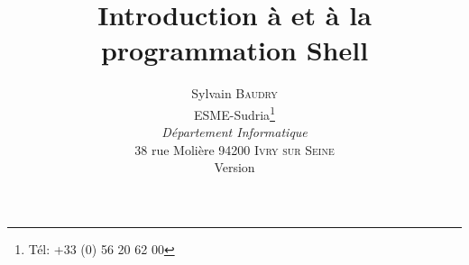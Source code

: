 \documentclass[titlepage,twoside,a4paper]{book}
\title{
	Introduction {\`a} {\Unix} et {\`a} la programmation Shell
}
\author{
	Sylvain \textsc{Baudry}\\[3ex]
	ESME-Sudria\thanks{T{\'e}l: +33 (0)  56 20 62 00}\\
	\textsl{D{\'e}partement Informatique}\\
	38 rue Moli{\`e}re
	94200 \textsc{Ivry sur Seine}\\[3ex]
	Version \docversion
}
\date{\docdate}
\newcounter{remarque-cnt}
\newcounter{example-cnt}
\begin{document}
\newenvironment{example}{
	\begin{sloppypar}
	\noindent
	\textbf{Exemple~{\thechapter}.\arabic{example-cnt}~:}\\
	\hspace*{\fill} \linebreak \vspace{-7ex}
	\begin{quote}
}
{	\end{quote}
	\stepcounter{example-cnt}
	\end{sloppypar}
}

\newenvironment{remarque}{
	\begin{sloppypar}
	\noindent
	\textbf{Remarque~{\thechapter}.\arabic{remarque-cnt}~:}\\
	\hspace*{\fill} \linebreak \vspace{-7ex}
	\begin{quote}\it
}
{
	\end{quote}
	\stepcounter{remarque-cnt}
	\end{sloppypar}
}

\newenvironment{definition}[1]{
	\begin{sloppypar}
	\noindent
	\textbf{#1~:}\\
	\hspace*{\fill} \linebreak \vspace{-7ex}
	\begin{quote}
}
{	\end{quote}
	\end{sloppypar}
}


\maketitle						%

\frontmatter

\lhead[Pr{\'e}face]{}
\chead{}

\clearpage						%
\newpage
\lhead[\contentsname]{}
\chead{}
\rhead[]{\contentsname}
\end{document}
